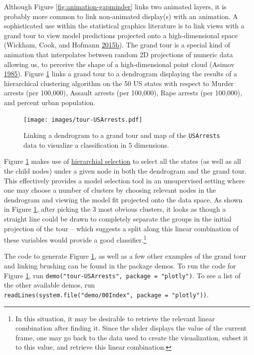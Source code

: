 \documentclass[12pt,]{isuthesis}
\let\rmarkdownfootnote\footnote%
\def\footnote{\protect\rmarkdownfootnote}
\begin{document}
Although Figure \ref{fig:animation-gapminder} links two animated layers,
it is probably more common to link non-animated display(s) with an
animation. A sophisticated use within the statistical graphics
literature is to link views with a grand tour to view model predictions
projected onto a high-dimensional space (Wickham, Cook, and Hofmann
\protect\hyperlink{ref-model-vis-paper}{2015}\protect\hyperlink{ref-model-vis-paper}{b}).
The grand tour is a special kind of animation that interpolates between
random 2D projections of numeric data allowing us, to perceive the shape
of a high-dimensional point cloud (Asimov
\protect\hyperlink{ref-grand-tour}{1985}). Figure
\ref{fig:tour-USArrests} links a grand tour to a dendrogram displaying
the results of a hierarchical clustering algorithm on the 50 US states
with respect to Murder arrests (per 100,000), Assault arrests (per
100,000), Rape arrests (per 100,000), and percent urban population.

\begin{figure}
\centering
\texttt{[image: images/tour-USArrests.pdf]}
\caption{\label{fig:tour-USArrests}Linking a dendrogram to a grand tour and
map of the \texttt{USArrests} data to visualize a classification in 5
dimensions.}
\end{figure}

Figure \ref{fig:tour-USArrests} makes use of
\protect\hyperlink{hierarchial-selection}{hierarchial selection} to
select all the states (as well as all the child nodes) under a given
node in both the dendrogram and the grand tour. This effectively
provides a model selection tool in an unsupervised setting where one may
choose a number of clusters by choosing relevant nodes in the dendrogram
and viewing the model fit projected onto the data space. As shown in
Figure \ref{fig:tour-USArrests}, after picking the 3 most obvious
clusters, it looks as though a straight line could be drawn to
completely separate the groups in the initial projection of the tour --
which suggests a split along this linear combination of these variables
would provide a good classifier.\footnote{In this situation, it may be
  desirable to retrieve the relevant linear combination after finding
  it. Since the slider displays the value of the current frame, one may
  go back to the data used to create the visualization, subset it to
  this value, and retrieve this linear combination.}

The code to generate Figure \ref{fig:tour-USArrests}, as well as a few
other examples of the grand tour and linking brushing can be found in
the package demos. To run the code for Figure \ref{fig:tour-USArrests},
run \texttt{demo("tour-USArrests",\ package\ =\ "plotly")}. To see a
list of the other available demos, run
\texttt{readLines(system.file("demo/00Index",\ package\ =\ "plotly"))}.
\end{document}
